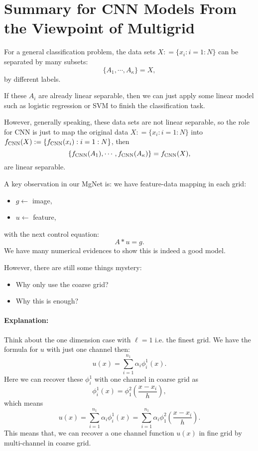 \section{Summary for CNN Models From the Viewpoint of Multigrid}
For a general classification problem, the data sets $X : = \{x_i: i = 1:N\}$ can be separated by many 
subsets: 
\begin{equation}
\{A_1, \cdots, A_{\kappa}\} = X,
\end{equation}
by different labels. 

If these $A_i$ are already linear separable, then we can just apply some linear model
such as logistic regression or SVM to finish the classification task.

However, generally speaking, these data sets are not linear separable, so the role for CNN
is just to map the original data $X : = \{x_i: i = 1:N\}$ into $f_{\rm CNN} (X) : =  \{f_{\rm CNN}(x_i): i = 1:N\}$,
then 
\begin{equation}
\{f_{\rm CNN}(A_1), \cdots, f_{\rm CNN}(A_{\kappa})\} = f_{\rm CNN} (X),
\end{equation}
are linear separable.

A key observation in our MgNet is: we have feature-data mapping in each grid:
\begin{itemize}
	\item $g \longleftarrow$ image,
	\item $u \longleftarrow$ feature,
\end{itemize}
with the next control equation:
\begin{equation}\label{eq:f-d-mapping}
A \ast u = g.
\end{equation}
We have many numerical evidences to show this is indeed a good model.

However, there are still some things mystery: 
\begin{itemize}
	\item Why only use the coarse grid?
	\item Why this is enough?
\end{itemize}

\paragraph{Explanation:} Think about the one dimension case with $\ell=1$ i.e. the finest grid.
We have the formula for $u$ with just one channel then:
\begin{equation}
u(x) = \sum_{i=1}^{n_1} \alpha_i \phi_i^1(x).
\end{equation}
Here we can recover these $\phi_{i}^1$ with one channel in coarse grid as
\begin{equation}
\phi_i^1(x) = \phi_1^2(\frac{x-x_i}{h}),
\end{equation} 
which means
\begin{equation}
u(x) = \sum_{i=1}^{n_1} \alpha_i \phi_i^1(x) = \sum_{i=1}^{n_1} \alpha_i \phi_1^2(\frac{x-x_i}{h}).
\end{equation}
This means that, we can recover a one channel function $u(x)$ in fine grid
by multi-channel in coarse grid.

